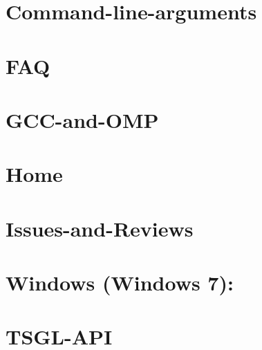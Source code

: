 \documentclass[twoside]{book}
\newcommand{\+}{\discretionary{\mbox{\scriptsize$\hookleftarrow$}}{}{}}
\begin{document}
\chapter{Command-\/line-\/arguments}
\label{md__home_pretzel_workspace_tsgl__t_s_g_l_docs-wiki__command-line-arguments}
\hypertarget{md__home_pretzel_workspace_tsgl__t_s_g_l_docs-wiki__command-line-arguments}{}

\chapter{F\+A\+Q}
\label{md__home_pretzel_workspace_tsgl__t_s_g_l_docs-wiki__f_a_q}
\hypertarget{md__home_pretzel_workspace_tsgl__t_s_g_l_docs-wiki__f_a_q}{}

\chapter{G\+C\+C-\/and-\/\+O\+M\+P}
\label{md__home_pretzel_workspace_tsgl__t_s_g_l_docs-wiki__g_c_c-and-_o_m_p}
\hypertarget{md__home_pretzel_workspace_tsgl__t_s_g_l_docs-wiki__g_c_c-and-_o_m_p}{}

\chapter{Home}
\label{md__home_pretzel_workspace_tsgl__t_s_g_l_docs-wiki__home}
\hypertarget{md__home_pretzel_workspace_tsgl__t_s_g_l_docs-wiki__home}{}

\chapter{Issues-\/and-\/\+Reviews}
\label{md__home_pretzel_workspace_tsgl__t_s_g_l_docs-wiki__issues-and-_reviews}
\hypertarget{md__home_pretzel_workspace_tsgl__t_s_g_l_docs-wiki__issues-and-_reviews}{}

\chapter{Windows (Windows 7)\+:}
\label{md__home_pretzel_workspace_tsgl__t_s_g_l_docs-wiki__library-_versions}
\hypertarget{md__home_pretzel_workspace_tsgl__t_s_g_l_docs-wiki__library-_versions}{}

\chapter{T\+S\+G\+L-\/\+A\+P\+I}
\label{md__home_pretzel_workspace_tsgl__t_s_g_l_docs-wiki__t_s_g_l-_a_p_i}
\hypertarget{md__home_pretzel_workspace_tsgl__t_s_g_l_docs-wiki__t_s_g_l-_a_p_i}{}

\end{document}
